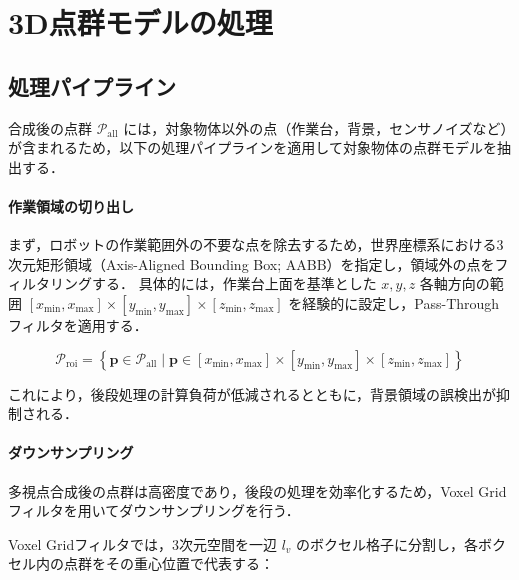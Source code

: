 \section{3D点群モデルの処理}
\label{sec:system:pointcloud:processing}

\subsection{処理パイプライン}
\label{sec:system:pointcloud:processing:pipeline}

合成後の点群 $\mathcal{P}_{\mathrm{all}}$ には，対象物体以外の点（作業台，背景，センサノイズなど）が含まれるため，以下の処理パイプラインを適用して対象物体の点群モデルを抽出する．

\paragraph{作業領域の切り出し}

まず，ロボットの作業範囲外の不要な点を除去するため，世界座標系における3次元矩形領域（Axis-Aligned Bounding Box; AABB）を指定し，領域外の点をフィルタリングする．
具体的には，作業台上面を基準とした $x, y, z$ 各軸方向の範囲 $[x_{\min}, x_{\max}] \times [y_{\min}, y_{\max}] \times [z_{\min}, z_{\max}]$ を経験的に設定し，Pass-Throughフィルタを適用する．

\begin{equation}
  \mathcal{P}_{\mathrm{roi}} = \left\{ \bm{p} \in \mathcal{P}_{\mathrm{all}} \;|\; \bm{p} \in [x_{\min}, x_{\max}] \times [y_{\min}, y_{\max}] \times [z_{\min}, z_{\max}] \right\}
  \label{eq:system:roi}
\end{equation}

これにより，後段処理の計算負荷が低減されるとともに，背景領域の誤検出が抑制される．

\paragraph{ダウンサンプリング}

多視点合成後の点群は高密度であり，後段の処理を効率化するため，Voxel Gridフィルタを用いてダウンサンプリングを行う．

Voxel Gridフィルタでは，3次元空間を一辺 $l_v$ のボクセル格子に分割し，各ボクセル内の点群をその重心位置で代表する：

